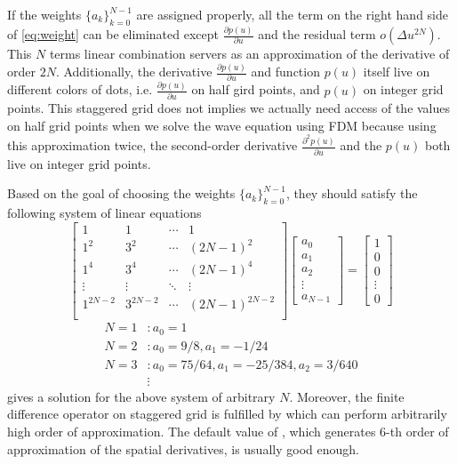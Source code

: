 \documentclass[11pt,titlepage]{article}
\theoremstyle{plain}
\theoremstyle{definition}
\theoremstyle{remark}
\numberwithin{equation}{section}
\begin{document}
If the weights $\{ a_k\}_{k=0}^{N-1}$ are assigned properly, all the term on the right hand side of \eqref{eq:weight} can be eliminated except $\frac{\partial p(u)}{\partial u}$ and the residual term $o(\Delta u^{2N})$. This $N$ terms linear combination servers as an approximation of the derivative of order $2N$. Additionally, the derivative $\frac{\partial p(u)}{\partial u}$ and function $p(u)$ itself live on different colors of dots, i.e. $\frac{\partial p(u)}{\partial u}$ on half gird points, and $p(u)$ on integer grid points. This staggered grid does not implies we actually need access of the values on half grid points when we solve the wave equation using FDM because using this approximation twice, the second-order derivative $\frac{\partial^2 p(u)}{\partial u}$ and the $p(u)$ both live on integer grid points.

Based on the goal of choosing the weights $\{a_k\}_{k=0}^{N-1}$, they should satisfy the following system of linear equations
\begin{equation*}
\begin{bmatrix}
  1 & 1 & \cdots & 1\\
  1^2 & 3^2 & \cdots & (2N-1)^2\\
  1^4 & 3^4 & \cdots & (2N-1)^4\\
  \vdots & \vdots & \ddots & \vdots\\
  1^{2N-2} & 3^{2N-2} & \cdots & (2N-1)^{2N-2}\\
\end{bmatrix}
\begin{bmatrix}
  a_0 \\ a_1 \\ a_2 \\ \vdots \\ a_{N-1}
\end{bmatrix}
=
\begin{bmatrix}
  1 \\ 0 \\ 0 \\ \vdots \\ 0
\end{bmatrix}
\end{equation*}
\begin{equation*}
  \begin{aligned}
  N = 1&: a_0 = 1\\
  N = 2&: a_0 = 9/8, a_1 = -1/24\\
  N = 3&: a_0 = 75/64, a_1 = -25/384, a_2 = 3/640\\
  &\vdots
  \end{aligned}
\end{equation*}
 gives a solution for the above system of arbitrary $N$. Moreover, the finite difference operator on staggered grid is fulfilled by  which can perform arbitrarily high order of approximation. The default value of , which generates 6-th order of approximation of the spatial derivatives, is usually good enough.
\end{document}
